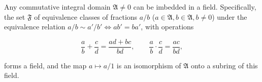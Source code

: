 Any commutative integral domain $\mathfrak{A} \neq 0$ can be imbedded in a field. Specifically, the set $\mathfrak{F}$ of equivalence classes of fractions $a/b$ ($a \in \mathfrak{A}, b \in \mathfrak{A}, b \neq 0$) under the equivalence relation $a/b \sim a'/b' \iff ab' = ba'$, with operations

$$\frac{a}{b} + \frac{c}{d} = \frac{ad + bc}{bd}, \qquad \frac{a}{b} \cdot \frac{c}{d} = \frac{ac}{bd},$$

forms a field, and the map $a \mapsto a/1$ is an isomorphism of $\mathfrak{A}$ onto a subring of this field.
